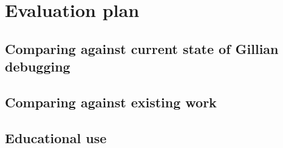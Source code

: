 \chapter{Evaluation plan}
\label{cha:eval}
\section{Comparing against current state of Gillian debugging}
\section{Comparing against existing work}
\section{Educational use}
